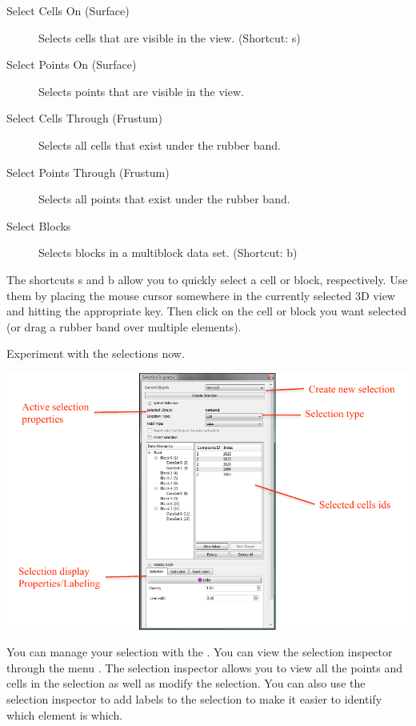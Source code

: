 \begin{description}
\item[\selectCellsOn Select Cells On (Surface)] Selects cells that are
  visible in the view.  (Shortcut: s)
\item[\selectPointsOn Select Points On (Surface)] Selects points that are
  visible in the view.
\item[\selectCellsThrough Select Cells Through (Frustum)] Selects all cells
  that exist under the rubber band.
\item[\selectPointsThrough Select Points Through (Frustum)] Selects all
  points that exist under the rubber band.
\item[\selectBlocks Select Blocks] Selects blocks in a
  multiblock data set.  (Shortcut: b)
\end{description}

The shortcuts s and b allow you to quickly select a cell or block,
respectively.  Use them by placing the mouse cursor somewhere in the
currently selected 3D view and hitting the appropriate key.  Then click on
the cell or block you want selected (or drag a rubber band over multiple
elements).

Experiment with the selections now.

\begin{inlinefig}
  \includegraphics{images/SelectionInspector}
\end{inlinefig}

You can manage your selection with the .  You
can view the selection inspector through the menu  \ra
{}.  The selection inspector allows you to view all
the points and cells in the selection as well as modify the selection.  You
can also use the selection inspector to add labels to the selection to make
it easier to identify which element is which.

